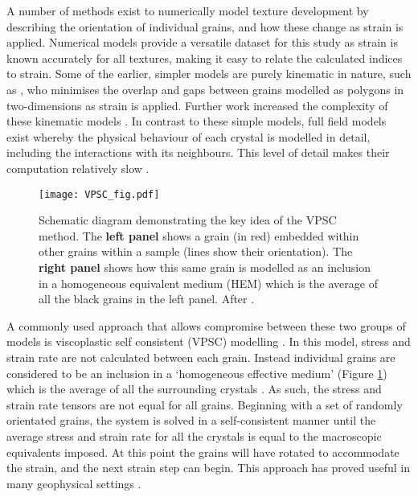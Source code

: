 \documentclass[a4paper,12pt,twoside]{report}
\numberwithin{equation}{chapter}
\begin{document}
A number of methods exist to numerically model texture development by describing the orientation of individual grains, and how these change as strain is applied. Numerical models provide a versatile dataset for this study as strain is known accurately for all textures, making it easy to relate the calculated indices to strain. Some of the earlier, simpler models are purely kinematic in nature, such as \cite{Etchecopar1977}, who minimises the overlap and gaps between grains modelled as polygons in two-dimensions as strain is applied. Further work increased the complexity of these kinematic models \citep[e.g. using differential equations,][]{Ribe1989}. In contrast to these simple models, full field models exist \citep[e.g. finite element,][]{Sarma1996} whereby the physical behaviour of each crystal is modelled in detail, including the interactions with its neighbours. This level of detail makes their computation relatively slow \citep{Goulding2015}.

\begin{figure}[t]
  \centering
    \texttt{[image: VPSC\_fig.pdf]}
  \caption[VPSC method]{Schematic diagram demonstrating the key idea of the VPSC method. The \textbf{left panel} shows a grain (in red) embedded within other grains within a sample (lines show their orientation). The \textbf{right panel} shows how this same grain is modelled as an inclusion in a homogeneous equivalent medium (HEM) which is the average of all the black grains in the left panel. After \cite{Castelnau1996}.}
  \label{fig:VPSC_method}
\end{figure}

A commonly used approach that allows compromise between these two groups of models is viscoplastic self consistent (VPSC) modelling \citep{Molinari1987,Lebensohn1993}. In this model, stress and strain rate are not calculated between each grain. Instead individual grains are considered to be an inclusion in a \lq{}homogeneous effective medium\rq{} (Figure \ref{fig:VPSC_method}) which is the average of all the surrounding crystals \citep[i.e. nearest neighbour effects are not taken into account][]{Castelnau1996}. As such, the stress and strain rate tensors are not equal for all grains. Beginning with a set of randomly orientated grains, the system is solved in a self-consistent manner until the average stress and strain rate for all the crystals is equal to the macroscopic equivalents imposed. At this point the grains will have rotated to accommodate the strain, and the next strain step can begin. This approach has proved useful in many geophysical settings \citep[e.g.][]{Wenk1999}.
\end{document}
